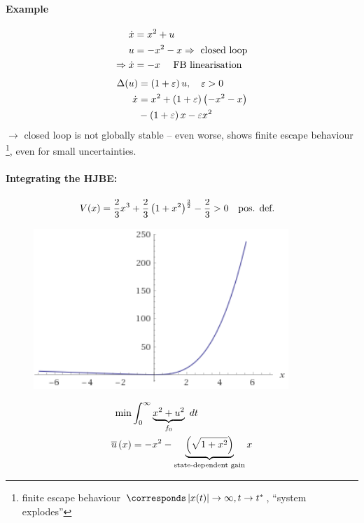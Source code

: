 \paragraph{Example}
\begin{align*}
    \dot{x} &= x^2 + u\\
    u &= -x^2 - x \Rightarrow \textnormal{ closed loop}\\
    \Rightarrow \dot{x} &= -x \quad \textnormal{ FB linearisation}
\end{align*}
\begin{align*}
    \Delta(u) &= \left( 1 + \varepsilon \right) u, \quad \varepsilon > 0\\
    \dot{x} &= x^2 + \left( 1 + \varepsilon \right) \left( -x^2 -x \right)\\
        & -\left( 1 + \varepsilon \right)x - \varepsilon x^2
\end{align*}
$\rightarrow$ closed loop is not globally stable -- even worse,
shows finite escape behaviour%
\footnote{finite escape behaviour $\corresponds \modl{x(t)} \rightarrow \infty, t \rightarrow t^*$, ``system explodes'' },
even for small uncertainties.

\paragraph{Integrating the HJBE:}
\begin{align*}
    V(x) &= \frac{2}{3}x^3 + \frac{2}{3}\left( 1+x^2 \right)^{\frac{3}{2}} - \frac{2}{3} > 0
    \quad \textnormal{pos. def.}
\end{align*}
\begin{figure}[H]
    \centering
    \includegraphics[width=0.8\columnwidth]{img/vx-posdef.png}
\end{figure}
\begin{align*}
    \min & \intdt{0}{\infty}{\underbrace{x^2 + u^2}_{f_0}}\\
    \ubar{x} &= -x^2 - \underbrace{\paren{\sqrt{1 + x^2}}}_{\txt{state-dependent gain}} x
\end{align*}

